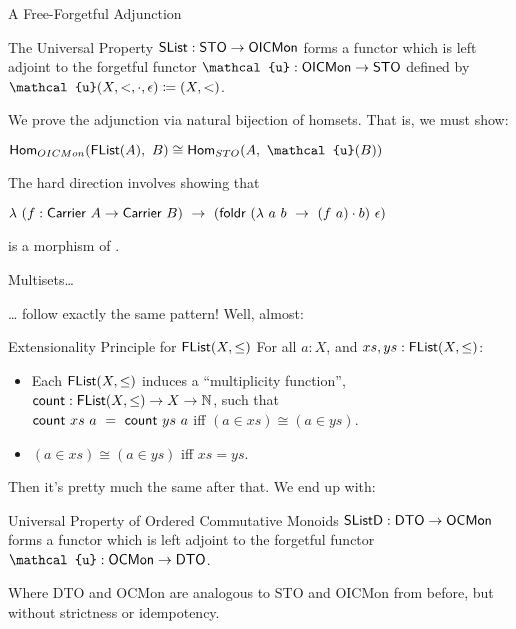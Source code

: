 \documentclass{beamer}
\begin{document}
\begin{frame}{A Free-Forgetful Adjunction}
\begin{block}{The Universal Property}
   $\AgdaDatatype{SList} : \AgdaDatatype{STO} \to \AgdaDatatype{OICMon}$ forms a functor which is left adjoint to the forgetful functor $\AgdaDatatype{\ensuremath{\mathcal{u}}} : \AgdaDatatype{OICMon} \to \AgdaDatatype{STO}$ defined by $\AgdaDatatype{\ensuremath{\mathcal{u}}}(X,<,\cdot,\epsilon) \coloneq (X,<)$.
 \end{block}
 \pause
We prove the adjunction via natural bijection of homsets. That is, we must show:

\begin{center}
  $\mathsf{Hom}_{OICMon}(\AgdaDatatype{FList}(A),~B) \cong \mathsf{Hom}_{STO}(A,~ \AgdaDatatype{\ensuremath{\mathcal{u}}}(B))$
\end{center}
\pause

The hard direction involves showing that
\begin{center}
$\lambda~(f : \AgdaField{Carrier}~A \to \AgdaField{Carrier}~B)~\to~(\AgdaFunction{foldr}~(\lambda~a~b~\to~(f~a) \cdot b)~\epsilon)$
\end{center}
is a morphism of .


\end{frame}

\begin{frame}{Multisets\ldots{}}

  \ldots{} follow exactly the same pattern! Well, almost:

  \begin{block}{Extensionality Principle for $\AgdaDatatype{FList}(X, \leq)$}
    For all $a : X$, and $xs, ys : \AgdaDatatype{FList}(X, \leq)$:
  \begin{itemize}
    \item Each $\AgdaDatatype{FList}(X, \leq)$ induces a ``multiplicity function'', $\AgdaFunction{count} : \AgdaDatatype{FList}(X,\leq) \to X \to \mathbb{N}$, such that \\
          $\AgdaFunction{count}~xs~a~=~\AgdaFunction{count}~ys~a$ iff $(a \in xs) \cong (a \in ys) $.
    \item $(a \in xs) \cong (a \in ys)$ iff $xs = ys$.
  \end{itemize}
 \end{block}

 Then it's pretty much the same after that. We end up with:

 \begin{block}{Universal Property of Ordered Commutative Monoids}
   $\AgdaDatatype{SListD} : \AgdaDatatype{DTO} \to \AgdaDatatype{OCMon}$ forms a functor which is left adjoint to the forgetful functor $\AgdaDatatype{\ensuremath{\mathcal{u}}} : \AgdaDatatype{OCMon} \to \AgdaDatatype{DTO}$.
 \end{block}

 Where DTO and OCMon are analogous to STO and OICMon from before, but without strictness or idempotency.
\end{frame}
\end{document}
